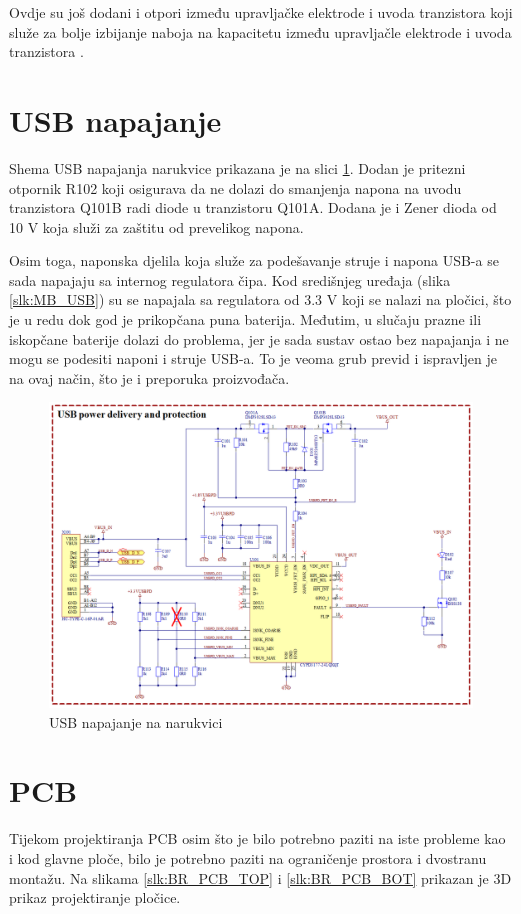 Ovdje su još dodani i otpori između upravljačke elektrode i uvoda tranzistora koji služe za bolje izbijanje naboja na kapacitetu između upravljačle elektrode i uvoda tranzistora \cite{ti:bq29700}.

\section{USB napajanje}
\label{sec:BR_USB}
Shema USB napajanja narukvice prikazana je na slici \ref{slk:BR_USB}. Dodan je pritezni otpornik R102 koji osigurava da ne dolazi do smanjenja napona na uvodu tranzistora Q101B radi diode u tranzistoru Q101A. Dodana je i Zener dioda od 10 V koja služi za zaštitu od prevelikog napona.

Osim toga, naponska djelila koja služe za podešavanje struje i napona USB-a se sada napajaju sa internog regulatora čipa. Kod središnjeg uređaja (slika \ref{slk:MB_USB}) su se napajala sa regulatora od 3.3 V koji se nalazi na pločici, što je u redu dok god je prikopčana puna baterija. Međutim, u slučaju prazne ili iskopčane baterije dolazi do problema, jer je sada sustav ostao bez napajanja i ne mogu se podesiti naponi i struje USB-a. To je veoma grub previd i ispravljen je na ovaj način, što je i preporuka proizvođača.
\begin{figure}[htb]
    \centering
    \includegraphics[width=\textwidth]{Figures/BR_USB.png}
    \caption{USB napajanje na narukvici}
    \label{slk:BR_USB}
\end{figure}
\section{PCB}
Tijekom projektiranja PCB osim što je bilo potrebno paziti na iste probleme kao i kod glavne ploče, bilo je potrebno paziti na ograničenje prostora i dvostranu montažu. Na slikama \ref{slk:BR_PCB_TOP} i \ref{slk:BR_PCB_BOT} prikazan je 3D prikaz projektiranje pločice.

